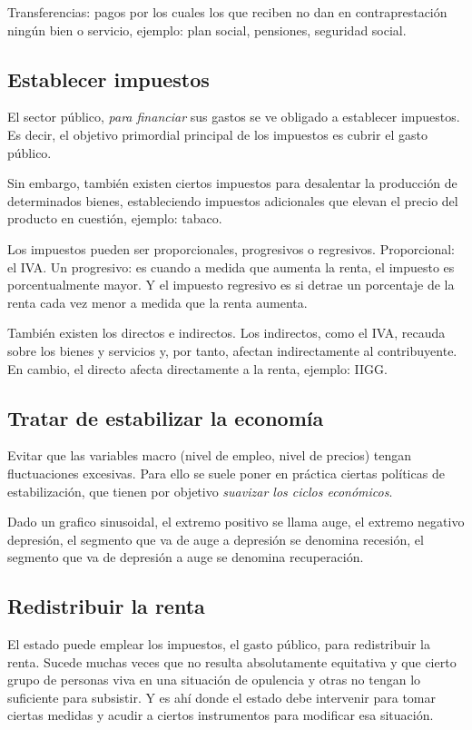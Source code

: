 Transferencias: pagos por los cuales los que reciben no dan en contraprestación ningún bien o servicio,
ejemplo: plan social, pensiones, seguridad social.

\subsection{Establecer impuestos}

El sector público, \textit{para financiar} sus gastos se ve obligado a establecer impuestos.
Es decir, el objetivo primordial principal de los impuestos es cubrir el gasto público.

Sin embargo, también existen ciertos impuestos para desalentar la producción de determinados bienes,
estableciendo impuestos adicionales que elevan el precio del producto en cuestión,
ejemplo: tabaco.

Los impuestos pueden ser proporcionales, progresivos o regresivos.
Proporcional: el IVA. 
Un progresivo: es cuando a medida que aumenta la renta,
el impuesto es porcentualmente mayor. 
Y el impuesto regresivo es si detrae un porcentaje de la renta cada vez menor a medida que la renta aumenta.

También existen los directos e indirectos.
Los indirectos, como el IVA, recauda sobre los bienes y servicios y, por tanto,
afectan indirectamente al contribuyente.
En cambio, el directo afecta directamente a la renta, ejemplo: IIGG.

\subsection{Tratar de estabilizar la economía}

Evitar que las variables macro (nivel de empleo, nivel de precios) tengan fluctuaciones excesivas.
Para ello se suele poner en práctica ciertas políticas de estabilización,
que tienen por objetivo \textit{suavizar los ciclos económicos}.

Dado un grafico sinusoidal,
el extremo positivo se llama auge,
el extremo negativo depresión,
el segmento que va de auge a depresión se denomina recesión,
el segmento que va de depresión a auge se denomina recuperación.

\subsection{Redistribuir la renta}

El estado puede emplear los impuestos, el gasto público, para redistribuir la renta.
Sucede muchas veces que no resulta absolutamente equitativa y que cierto grupo de personas
viva en una situación de opulencia y otras no tengan lo suficiente para subsistir.
Y es ahí donde el estado debe intervenir para tomar ciertas medidas y acudir a ciertos instrumentos para modificar esa situación.

